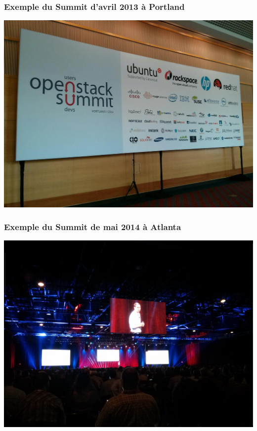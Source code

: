   \begin{frame}
    \frametitle{Exemple du Summit d'avril 2013 à Portland}
    \includegraphics[width=\textwidth]{images/photo-summit.jpg}
  \end{frame}

  \begin{frame}
    \frametitle{Exemple du Summit de mai 2014 à Atlanta}
    \includegraphics[width=\textwidth]{images/photo-summit1.jpg}
  \end{frame}


